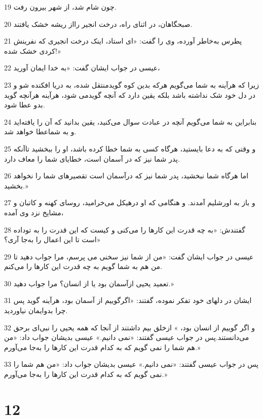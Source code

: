 \par 19 چون شام شد، از شهر بیرون رفت.
\par 20 صبحگاهان، در اثنای راه، درخت انجیر رااز ریشه خشک یافتند.
\par 21 پطرس به‌خاطر آورده، وی را گفت: «ای استاد، اینک درخت انجیری که نفرینش کردی خشک شده!»
\par 22 عیسی در جواب ایشان گفت: «به خدا ایمان آورید،
\par 23 زیرا که هرآینه به شما می‌گویم هر‌که بدین کوه گویدمنتقل شده، به دریا افکنده شو و در دل خود شک نداشته باشد بلکه یقین دارد که آنچه گویدمی شود، هرآینه هر‌آنچه گوید بدو عطا شود.
\par 24 بنابراین به شما می‌گویم آنچه در عبادت سوال می‌کنید، یقین بدانید که آن را یافته‌اید و به شماعطا خواهد شد.
\par 25 و وقتی که به دعا بایستید، هرگاه کسی به شما خطا کرده باشد، او را ببخشید تاآنکه پدر شما نیز که در آسمان است، خطایای شما را معاف دارد.
\par 26 اما هرگاه شما نبخشید، پدر شما نیز که درآسمان است تقصیرهای شما را نخواهد بخشید.»
\par 27 و باز به اورشلیم آمدند. و هنگامی که او درهیکل می‌خرامید، روسای کهنه و کاتبان و مشایخ نزد وی آمده،
\par 28 گفتندش: «به چه قدرت این کارها را می‌کنی و کیست که این قدرت را به توداده است تا این اعمال را به‌جا آری؟»
\par 29 عیسی در جواب ایشان گفت: «من از شما نیز سخنی می پرسم، مرا جواب دهید تا من هم به شما گویم به چه قدرت این کارها را می‌کنم.
\par 30 تعمید یحیی ازآسمان بود یا از انسان؟ مرا جواب دهید.»
\par 31 ایشان در دلهای خود تفکر نموده، گفتند: «اگرگوییم از آسمان بود، هرآینه گوید پس چرا بدوایمان نیاوردید.
\par 32 و اگر گوییم از انسان بود، » ازخلق بیم داشتند از آنجا که همه یحیی را نبی‌ای برحق می‌دانستند.پس در جواب عیسی گفتند: «نمی دانیم.» عیسی بدیشان جواب داد: «من هم شما را نمی گویم که به کدام قدرت این کارها را به‌جا می‌آورم.»
\par 33 پس در جواب عیسی گفتند: «نمی دانیم.» عیسی بدیشان جواب داد: «من هم شما را نمی گویم که به کدام قدرت این کارها را به‌جا می‌آورم.»

\chapter{12}

